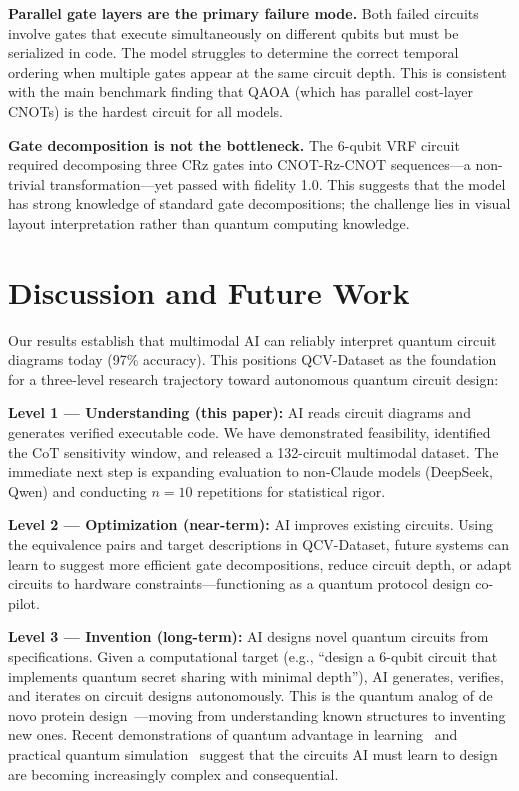 \documentclass[conference]{IEEEtran}
\begin{document}
\textbf{Parallel gate layers are the primary failure mode.} Both failed circuits involve gates that execute simultaneously on different qubits but must be serialized in code. The model struggles to determine the correct temporal ordering when multiple gates appear at the same circuit depth. This is consistent with the main benchmark finding that QAOA (which has parallel cost-layer CNOTs) is the hardest circuit for all models.

\textbf{Gate decomposition is not the bottleneck.} The 6-qubit VRF circuit required decomposing three CRz gates into CNOT-Rz-CNOT sequences---a non-trivial transformation---yet passed with fidelity 1.0. This suggests that the model has strong knowledge of standard gate decompositions; the challenge lies in visual layout interpretation rather than quantum computing knowledge.


\section{Discussion and Future Work}

Our results establish that multimodal AI can reliably interpret quantum circuit diagrams today (97\% accuracy). This positions QCV-Dataset as the foundation for a three-level research trajectory toward autonomous quantum circuit design:

\textbf{Level 1 --- Understanding (this paper):} AI reads circuit diagrams and generates verified executable code. We have demonstrated feasibility, identified the CoT sensitivity window, and released a 132-circuit multimodal dataset. The immediate next step is expanding evaluation to non-Claude models (DeepSeek, Qwen) and conducting $n=10$ repetitions for statistical rigor.

\textbf{Level 2 --- Optimization (near-term):} AI improves existing circuits. Using the equivalence pairs and target descriptions in QCV-Dataset, future systems can learn to suggest more efficient gate decompositions, reduce circuit depth, or adapt circuits to hardware constraints---functioning as a quantum protocol design co-pilot.

\textbf{Level 3 --- Invention (long-term):} AI designs novel quantum circuits from specifications. Given a computational target (e.g., ``design a 6-qubit circuit that implements quantum secret sharing with minimal depth''), AI generates, verifies, and iterates on circuit designs autonomously. This is the quantum analog of de novo protein design~\cite{jumper2021alphafold}---moving from understanding known structures to inventing new ones. Recent demonstrations of quantum advantage in learning~\cite{huang2022quantum} and practical quantum simulation~\cite{daley2022practical} suggest that the circuits AI must learn to design are becoming increasingly complex and consequential.
\end{document}
